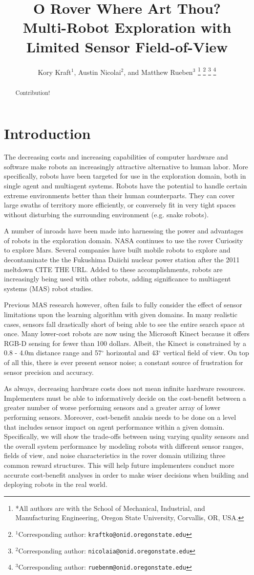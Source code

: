\documentclass[letterpaper, 10 pt, conference]{ieeeconf}  %
\title{\LARGE \bf 
O Rover Where Art Thou?\\
Multi-Robot Exploration with Limited Sensor Field-of-View
}
\author{Kory Kraft$^{1}$, Austin Nicolai$^{2}$, and Matthew Rueben$^{3}$%
\thanks{*All authors are with the School of Mechanical, Industrial, and Manufacturing Engineering,
         Oregon State University,
         Corvallis, OR, USA. }%
\thanks{$^{1}$Corresponding author: {\tt\small kraftko@onid.oregonstate.edu}}%
\thanks{$^{2}$Corresponding author: {\tt\small nicolaia@onid.oregonstate.edu}}%
\thanks{$^{3}$Corresponding author: {\tt\small ruebenm@onid.oregonstate.edu}}%
}
\begin{document}
\maketitle
\thispagestyle{empty}
\pagestyle{empty}

\begin{abstract}
Contribution!
\end{abstract}


\section{Introduction}
The decreasing costs and increasing capabilities of computer hardware and software make
robots an increasingly attractive alternative to human labor. More specifically, robots have 
been targeted for use in the exploration domain, both in single agent and 
multiagent systems.  Robots have the potential to
handle certain extreme environments better than their human
counterparts.  They can cover large swaths of territory more
efficiently, or conversely fit in very tight spaces without disturbing
the surrounding environment (e.g. snake robots). 

A number of inroads have been made into harnessing the power and
advantages of robots in the exploration domain. NASA continues to use
the rover Curiosity to explore Mars. Several companies have built
mobile robots to explore and decontaminate the the Fukushima Daiichi
nuclear power station after the 2011 meltdown CITE THE URL. Added to these
accomplishments, robots are increasingly being used with other robots, 
adding significance to multiagent systems (MAS) robot studies.

Previous MAS research however, often fails to fully consider the effect of
sensor limitations upon the learning algorithm with given domains. In many realistic cases, sensors fall drastically short of being able to see the entire search space at once. Many lower-cost robots are now using the Microsoft Kinect because it offers RGB-D sensing for fewer than 100 dollars. Albeit, the Kinect is constrained by a 0.8 - 4.0m distance range and 57$^{\circ}$ horizontal and 43$^{\circ}$ vertical field of view. On top of all this, there is ever present sensor noise; a constant source of frustration for sensor precision and accuracy.

As always, decreasing hardware costs does not mean infinite hardware resources.
Implementers must be able to informatively decide on the cost-benefit 
between a greater number of worse performing sensors and a greater array of lower performing sensors. Moreover, cost-benefit analsis needs to be done on a level that includes sensor impact on  agent performance within a given domain. Specifically, we will show the trade-offs between using varying quality sensors and the overall system performance by modeling robots with different sensor ranges, fields of view, and noise characteristics in the rover domain utilizing three common reward structures. This will help future implementers conduct more accurate cost-benefit analyses in order to make wiser decisions when building and deploying robots in the real world.
\end{document}
